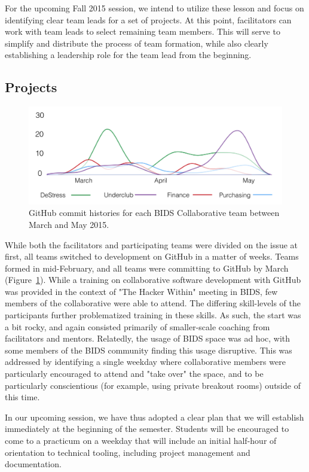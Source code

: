 \documentclass{sig-alternate}
\begin{document}
For the upcoming Fall 2015 session, we intend to utilize these lesson and focus on identifying clear team leads for a set of projects. At this point, facilitators can work with team leads to select remaining team members. This will serve to simplify and distribute the process of team formation, while also clearly establishing a leadership role for the team lead from the beginning.

\subsection{Projects}

\begin{figure}
\centerline{\includegraphics[scale=0.27]{dsc_figure_gitcommits.png}}
\caption{GitHub commit histories for each BIDS Collaborative team between March and May 2015.}
\label{fig:gitcommits}
\end{figure}

While both the facilitators and participating teams were divided on the issue at first, all teams switched to development on GitHub in a matter of weeks. Teams formed in mid-February, and all teams were committing to GitHub by March (Figure~\ref{fig:gitcommits}). While a training on collaborative software development with GitHub was provided in the context of "The Hacker Within" meeting in BIDS, few members of the collaborative were able to attend. The differing skill-levels of the participants further problematized training in these skills. As such, the start was a bit rocky, and again consisted primarily of smaller-scale coaching from facilitators and mentors. Relatedly, the usage of BIDS space was ad hoc, with some members of the BIDS community finding this usage disruptive. This was addressed by identifying a single weekday where collaborative members were particularly encouraged to attend and "take over" the space, and to be particularly conscientious (for example, using private breakout rooms) outside of this time.

In our upcoming session, we have thus adopted a clear plan that we will establish immediately at the beginning of the semester. Students will be encouraged to come to a practicum on a weekday that will include an initial half-hour of orientation to technical tooling, including project management and documentation.
\end{document}
